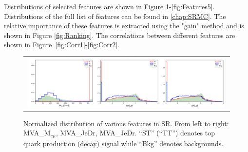 \begin{table}[th]
\sffamily
\centering
\caption{Names and descriptions of features only used by \ac{BDT} trained in \ac{SR}1}
\label{tab:SR1Features}
\end{table}

\begin{table}[th]
\sffamily
\centering
\caption{Names and description of features only used by \ac{BDT} trained in \ac{SR}2}
\label{tab:SR2Features}
\end{table}

Distributions of selected features are shown in Figure \ref{fig:Features1}-\ref{fig:Features5}. Distributions of the full list of features can be found in \autoref{chap:SRMC}. The relative importance of these features is extracted using the "gain" method and is shown in Figure \ref{fig:Ranking}. The correlations between different features are shown in Figure~\ref{fig:Corr1}-\ref{fig:Corr2}.

\begin{figure}[tbh!]
 \begin{center}
 \begin{tabular}{c}
 \includegraphics[width=0.99\textwidth]{figures/Part3/BDT/Features1}\\
 \end{tabular}
 \caption{Normalized distribution of various features in SR. From left to right: MVA\_M$_{e\mu}$, MVA\_JeDr, MVA\_JeDr. ``ST'' (``TT'') denotes top quark production (decay) signal while ``Bkg'' denotes backgrounds.}
 \label{fig:Features1}
 \end{center}
\end{figure}

